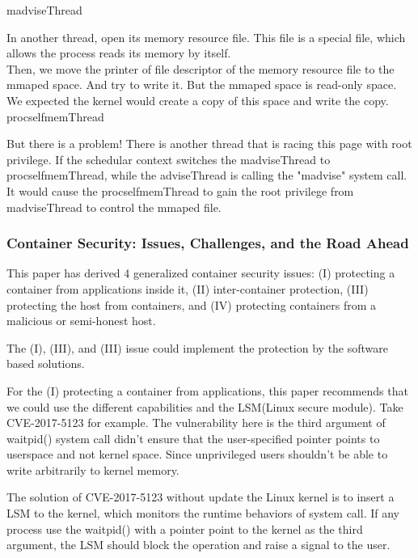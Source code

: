 \documentclass[12pt,a4paper]{IEEEconf}
\begin{document}
\hypertarget{madvise}{madviseThread}


In another thread, open its memory resource file. This file is a special file, which allows
the process reads its memory by itself.\\
Then, we move the printer of file descriptor of the memory resource file to the mmaped
space. And try to write it. But the mmaped space is read-only space. We expected the
kernel would create a copy of this space and write the copy\cite{root_exploit}.\\
\hypertarget{procself}{procselfmemThread}


But there is a problem! There is another thread that is racing this page with root privilege.
If the schedular context switches the madviseThread to procselfmemThread, while the
adviseThread is calling the "madvise" system call. It would cause the procselfmemThread
to gain the root privilege from madviseThread to control the mmaped file.

\subsubsection{Container Security: Issues, Challenges, and the Road Ahead}
This paper\cite{Road_Ahead} has derived 4 generalized container security issues:
(\RN{1}) protecting a container from applications inside it, (\RN{2}) inter-container
protection, (\RN{3}) protecting the host from containers, and (\RN{4}) protecting containers
from a malicious or semi-honest host.\cite{Road_Ahead}

The (\RN{1}), (\RN{3}), and (\RN{3}) issue could implement the protection by the software
based solutions.

For the (\RN{1}) protecting a container from applications, this paper recommends that
we could use the different capabilities and the LSM(Linux secure module). Take
CVE-2017-5123\cite{CVE-2017-5123} for example. The vulnerability here is the third argument of
waitpid() system call didn't ensure that the user-specified pointer points to userspace
and not kernel space. Since unprivileged users shouldn’t be able to write arbitrarily
to kernel memory.

The solution of CVE-2017-5123 without update the Linux kernel is to insert a
LSM to the kernel, which monitors the runtime behaviors of system call. If any process
use the waitpid() with a pointer point to the kernel as the third argument, the LSM should
block the operation and raise a signal to the user.
\end{document}
